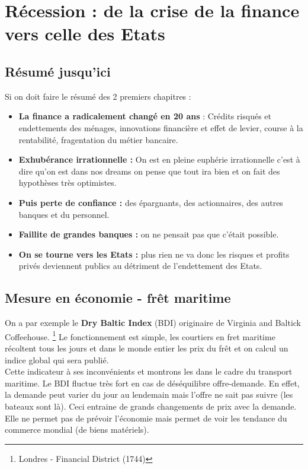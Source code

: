 
\chapter{Récession : de la crise de la finance vers celle des Etats}
\section{Résumé jusqu'ici}
Si on doit faire le résumé des 2 premiers chapitres : 
\begin{itemize}
\item \textbf{La finance a radicalement changé en 20 ans} : Crédits risqués et endettements des ménages, innovations financière et effet de levier, course à la rentabilité, fragentation du métier bancaire.

\item \textbf{Exhubérance irrationnelle :} On est en pleine euphérie irrationnelle c'est à dire qu'on est dans nos dreams on pense que tout ira bien et on fait des hypothèses très optimistes.

\item \textbf{Puis perte de confiance :} des épargnants, des actionnaires, des autres banques et du personnel. 

\item \textbf{Faillite de grandes banques :} on ne pensait pas que c'était possible. 

\item \textbf{On se tourne vers les Etats :} plus rien ne va donc les risques et profits privés deviennent publics au détriment de l'endettement des Etats.  
\end{itemize}

\section{Mesure en économie - frêt maritime}
On a par exemple le \textbf{Dry Baltic Index} (BDI) originaire de Virginia and Baltick Coffeehouse. \footnote{Londres - Financial District (1744)} Le fonctionnement est simple, les courtiers en fret maritime récoltent tous les jours et dans le monde entier les prix du frêt et on calcul un indice global qui sera publié.\\
Cette indicateur à ses inconvénients et montrons les dans le cadre du transport maritime. Le BDI fluctue très fort en cas de déséquilibre offre-demande. En effet, la demande peut varier du jour au lendemain mais l'offre ne sait pas suivre (les bateaux sont là). Ceci entraine de grands changements de prix avec la demande. Elle ne permet pas de prévoir l'économie mais permet de voir les tendance du commerce mondial (de biens matériels). 

